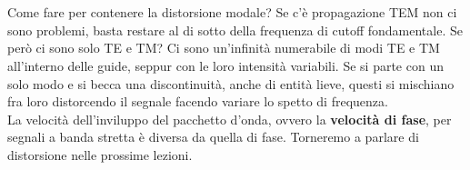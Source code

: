 \documentclass{book}
\begin{document}
    \\ \\
    Come fare per contenere la distorsione modale? Se c'è  propagazione TEM non ci sono problemi, basta 
    restare al di sotto della frequenza di cutoff fondamentale. Se però ci sono solo TE e TM? Ci sono un'infinità numerabile di modi
    TE e TM all'interno delle guide, seppur con le loro intensità variabili. Se si parte con un solo modo e si becca una discontinuità,
    anche di entità lieve, questi si mischiano fra loro distorcendo il segnale facendo variare lo spetto di frequenza. \\
    La velocità dell'inviluppo del pacchetto d'onda, ovvero la \textbf{velocità di fase}, per segnali a banda stretta è diversa da quella di fase. 
    Torneremo a parlare di distorsione nelle prossime lezioni.
\end{document}

